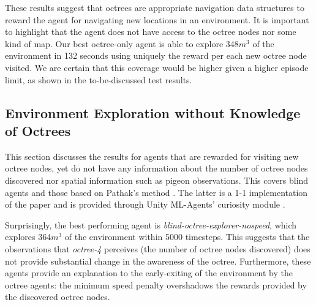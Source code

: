         
        

        These results suggest that octrees are appropriate navigation data structures to reward the agent for navigating new locations in an environment. It is important to highlight that the agent does not have access to the octree nodes nor some kind of map. 
        Our best octree-only agent is able to explore 348$m^3$ of the environment in 132 seconds using uniquely the reward per each new octree node visited. We are certain that this coverage would be higher given a higher episode limit, as shown in the to-be-discussed test results.
        
    
    \subsection{Environment Exploration without Knowledge of Octrees} \label{chap:5:discussion-env-exploration-wout-octrees}
  
        This section discusses the results for agents that are rewarded for visiting new octree nodes, yet do not have any information about the number of octree nodes discovered nor spatial information such as pigeon observations. This covers blind agents and those based on Pathak's method \cite{pathak2017curiosity}. The latter is a 1-1 implementation of the paper and is provided through Unity ML-Agents' curiosity module \cite{github-unity-mlagents-toolkit}.
        
        Surprisingly, the best performing agent is \textit{blind-octree-explorer-nospeed}, which explores 364$m^3$ of the environment within 5000 timesteps. This suggests that the observations that \textit{octree-4} perceives (the number of octree nodes discovered) does not provide substantial change in the awareness of the octree. 
        Furthermore, these agents provide an explanation to the early-exiting of the environment by the octree agents: the minimum speed penalty overshadows the rewards provided by the discovered octree nodes. 
        
